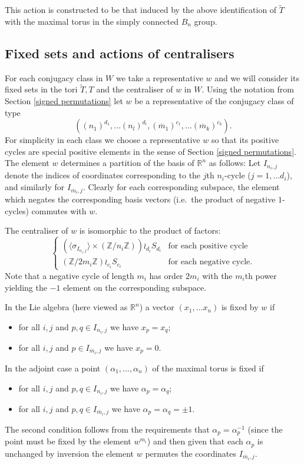 \documentclass[11pt,a4paper]{article}
\def\R{\mathbb{R}}
\def\Z{\mathbb{Z}}
\def\mbar{\overline{m}}
\def\mbar{\overline{m}}
\def\coveringtorus{\tilde{T}}
\begin{document}
This action is constructed to be that induced by the above identification of $\coveringtorus$ with the maximal torus in the simply connected $B_n$ group.

\bigskip




\subsection{Fixed sets and actions of centralisers}\label{B_n fixed sets} For each conjugacy class in $W$ we take a representative $w$ and we will consider its fixed sets in the tori $\coveringtorus, T$ and the centraliser of $w$ in $W$. Using the notation from Section \ref{signed permutations}
let $w$ be a representative of the conjugacy class of type
    \[
((n_1)^{d_1},\dots (n_l)^{d_l},(\mbar_1)^{c_1},\dots (\mbar_k)^{c_k}).
\]
For simplicity in each class we choose a representative $w$ so that its positive cycles are special positive elements in the sense of Section \ref{signed permutations}. The element $w$ determines a partition of the basis of $\R^n$ as follows: Let $I_{n_i,j}$ denote the indices of coordinates corresponding to the $j$th $n_i$-cycle ($j=1,\dots d_i$), and similarly for $I_{\mbar_i,j}$. Clearly for each corresponding subspace, the element which negates the corresponding basis vectors (i.e.\ the product of negative $1$-cycles) commutes with $w$. 


The centraliser of $w$ is isomorphic to the product of factors:
\[
\begin{cases}
(\langle \sigma_{I_{n_i,j}}\rangle \times (\Z/n_i\Z))\wr_{d_i}S_{d_i} & \text{for each positive cycle}\\
(\Z/2m_i\Z)\wr_{c_i}S_{c_i}& \text{for each negative cycle.}
\end{cases}
\]
Note that a negative cycle of length $m_i$ has order $2m_i$ with the $m_i$th power yielding the $-1$ element on the corresponding subspace.

\bigskip

In the Lie algebra (here viewed as $\R^n$) a vector $(x_1,\dots x_n)$ is fixed by $w$ if
\begin{itemize}
    \item for all $i,j$ and $p,q\in I_{n_i,j}$ we have $x_p=x_q$;
    \item for all $i,j$ and $p\in I_{\mbar_i,j}$ we have $x_p=0$.
\end{itemize}
In the adjoint case a point $(\alpha_1,\dots,\alpha_n)$ of the maximal torus  is fixed if
\begin{itemize}
    \item for all $i,j$ and $p,q\in I_{n_i,j}$ we have $\alpha_p=\alpha_q$;
    \item for all $i,j$ and $p,q\in I_{\mbar_i,j}$ we have $\alpha_p=\alpha_q=\pm 1$.
\end{itemize}
The second condition follows from the requirements that $\alpha_p=\alpha_p^{-1}$ (since the point must be fixed by the element $w^{m_i}$) and then given that each $\alpha_p$ is unchanged by inversion the element $w$ permutes the coordinates $I_{\mbar_i,j}$.
\end{document}
